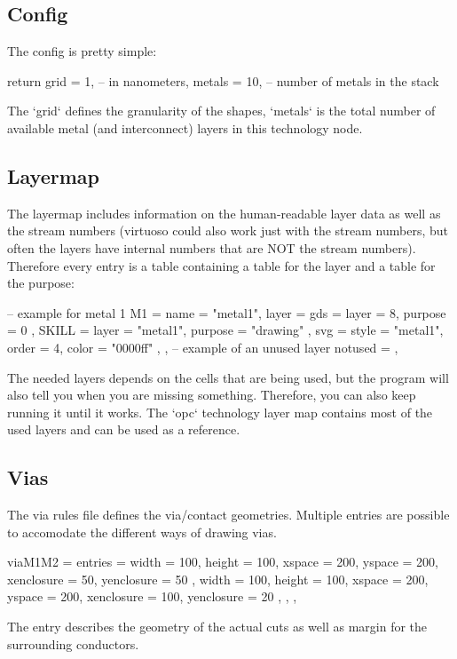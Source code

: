 \subsection{Config}
The config is pretty simple:

\begin{lualisting}
    return {
        grid = 1, -- in nanometers,
        metals = 10, -- number of metals in the stack
    }
\end{lualisting}

The `grid` defines the granularity of the shapes, `metals` is the total number of available metal (and interconnect) layers in this technology node.
\subsection{Layermap}
The layermap includes information on the human-readable layer data as well as the stream numbers (virtuoso could also work just with the stream
numbers, but often the layers have internal numbers that are NOT the stream numbers).
Therefore every entry is a table containing a table for the layer and a table for the purpose:

\begin{lualisting}
    -- example for metal 1
    M1 = {
        name = "metal1",
        layer = {
            gds = { layer = 8, purpose = 0 },
            SKILL = { layer = "metal1", purpose = "drawing" },
            svg = { style = "metal1", order = 4, color = "0000ff" },
        }
    },
    -- example of an unused layer
    notused = {},
\end{lualisting}

The needed layers depends on the cells that are being used, but the program will also tell you when you are missing something.
Therefore, you can also keep running it until it works.
The `opc` technology layer map contains most of the used layers and can be used as a reference.
\subsection{Vias}
The via rules file defines the via/contact geometries.
Multiple entries are possible to accomodate the different ways of drawing vias.

\begin{lualisting}
    viaM1M2 = {
        entries = {
            {
                width = 100, height = 100,
                xspace = 200, yspace = 200,
                xenclosure = 50, yenclosure = 50
            },
            {
                width = 100, height = 100,
                xspace = 200, yspace = 200,
                xenclosure = 100, yenclosure = 20
            },
        },
    },
\end{lualisting}

The entry describes the geometry of the actual cuts as well as margin for the surrounding conductors.



